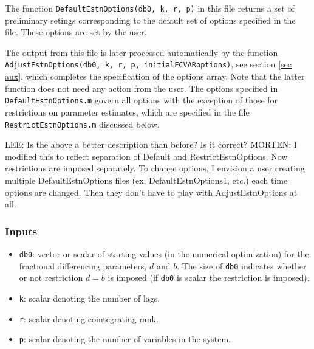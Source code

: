 \documentclass[12pt]{article}
\begin{document}
The function \texttt{DefaultEstnOptions(db0, k, r, p)} in this file returns a set of preliminary setings corresponding to the default set of options specified in the file. These options are set by the user. 

The output from this file is later processed automatically by the function \texttt{AdjustEstnOptions(db0, k, r, p, initialFCVARoptions)}, see section \ref{sec aux}, which completes the specification of the options array. Note that the latter function does not need any action from the user. The options specified in \texttt{DefaultEstnOptions.m} govern all options with the exception of those for restrictions on parameter estimates, which are specified in the file \texttt{RestrictEstnOptions.m} discussed below.


LEE: Is the above a better description than before? Is it correct?
MORTEN: I modified this to reflect separation of Default and RestrictEstnOptions. Now restrictions are imposed separately. To change options, I envision a user creating multiple DefaultEstnOptions files (ex: DefaultEstnOptions1, etc.) each time options are changed. Then they don't have to play with AdjustEstnOptions at all.

\subsubsection*{Inputs}

\begin{itemize}

\item  \texttt{db0}: vector or scalar of starting values (in the numerical optimization) for the fractional differencing parameters, $d$ and $b$. The size of \texttt{db0} indicates whether or not restriction $d=b$ is imposed (if \texttt{db0} is scalar the restriction is imposed).

\item \texttt{k}: scalar denoting the number of lags.

\item \texttt{r}: scalar denoting cointegrating rank.

\item \texttt{p}: scalar denoting the number of variables in the system.

\end{itemize}
\end{document}

